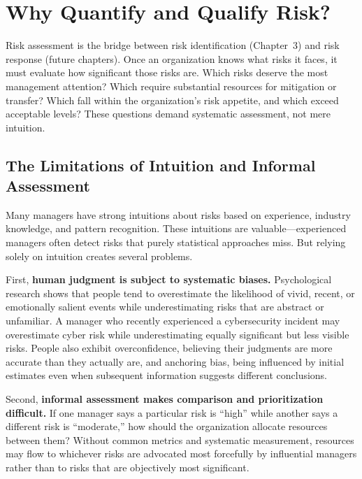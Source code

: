 \documentclass[11pt,openany]{book}
\begin{document}
\section{Why Quantify and Qualify Risk?}
\label{sec:why-quantify}

Risk assessment is the bridge between risk identification (Chapter~3) and risk
response (future chapters). Once an organization knows what risks it faces, it
must evaluate how significant those risks are. Which risks deserve the most
management attention? Which require substantial resources for mitigation or
transfer? Which fall within the organization's risk appetite, and which exceed
acceptable levels? These questions demand systematic assessment, not mere
intuition.

\subsection{The Limitations of Intuition and Informal Assessment}
\label{subsec:intuition-limits}

Many managers have strong intuitions about risks based on experience, industry
knowledge, and pattern recognition. These intuitions are valuable---experienced
managers often detect risks that purely statistical approaches miss. But
relying solely on intuition creates several problems.

First, \textbf{human judgment is subject to systematic biases.} Psychological
research shows that people tend to overestimate the likelihood of vivid, recent,
or emotionally salient events while underestimating risks that are abstract or
unfamiliar. A manager who recently experienced a cybersecurity incident may
overestimate cyber risk while underestimating equally significant but less
visible risks. People also exhibit overconfidence, believing their judgments are
more accurate than they actually are, and anchoring bias, being influenced by
initial estimates even when subsequent information suggests different
conclusions.

Second, \textbf{informal assessment makes comparison and prioritization
difficult.} If one manager says a particular risk is ``high'' while another
says a different risk is ``moderate,'' how should the organization allocate
resources between them? Without common metrics and systematic measurement,
resources may flow to whichever risks are advocated most forcefully by
influential managers rather than to risks that are objectively most
significant.
\end{document}
